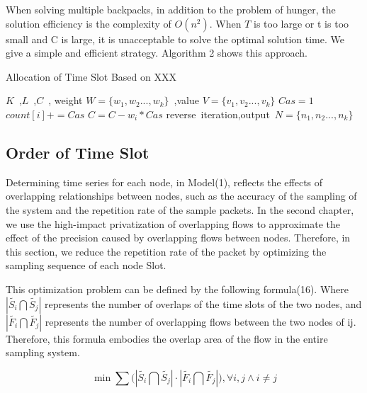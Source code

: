 \documentclass[conference,compsoc]{IEEEtran}
\begin{document}
When solving multiple backpacks, in addition to the problem of hunger, the solution efficiency is the complexity of $O(n^2)$. When $T$ is too large or t is too small and C is large, it is unacceptable to solve the optimal solution time. We give a simple and efficient strategy. Algorithm 2 shows this approach.

\begin{algorithm}[h]
\caption{Allocation of Time Slot Based on XXX}
\begin{algorithmic}[1]
\REQUIRE  $K$~,$L$~,$C$~, weight $W=\{w_1,w_2...,w_k\}$~,value $V=\{v_1,v_2...,v_k\}$
\STATE $Cas = 1$
\STATE $count[i]+= Cas$
\STATE $C = C - w_i * Cas$
\ENDIF
\ENDFOR
\ENDWHILE
\RETURN reverse~iteration,output~$N=\{n_{1},n_{2}...,n_{k}\}$
\label{code:recentEnd}
\end{algorithmic}
\end{algorithm}


\subsection{Order of Time Slot}

Determining time series for each node, in Model(1), reflects the effects of overlapping relationships between nodes, such as the accuracy of the sampling of the system and the repetition rate of the sample packets. In the second chapter, we use the high-impact privatization of overlapping flows to approximate the effect of the precision caused by overlapping flows between nodes. Therefore, in this section, we reduce the repetition rate of the packet by optimizing the sampling sequence of each node Slot.

This optimization problem can be defined by the following formula(16). Where $ \left| \widetilde{{{S}_{i}}}\bigcap \widetilde{{{S}_{j}}} \right| $ represents the number of overlaps of the time slots of the two nodes, and $\left| \widetilde{{{F}_{i}}}\bigcap \widetilde{{{F}_{j}}} \right|$ represents the number of overlapping flows between the two nodes of ij. Therefore, this formula embodies the overlap area of the flow in the entire sampling system.

\begin{equation}
\min \sum{(\left| \widetilde{{{S}_{i}}}\bigcap \widetilde{{{S}_{j}}} \right|}\cdot \left| \widetilde{{{F}_{i}}}\bigcap \widetilde{{{F}_{j}}} \right|),\forall i,j\wedge i\ne j
\end{equation}
\end{document}
